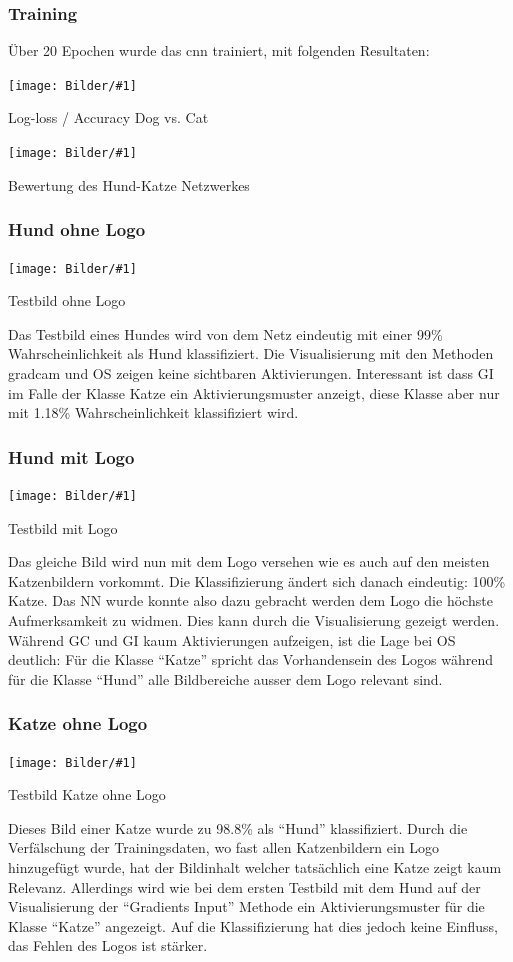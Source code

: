 \documentclass[
  12pt, %
  a4paper, %
  oneside, %
  openany, 
  numbers=noenddot, %
  BCOR=5mm, %
  parskip=half*, %
  thesis, %
]{bfhbook}
\newcommand{\imgText}[3]{
\begin{center}
    \begin{minipage}[t]{0.6\textwidth}
    		\vspace{0pt}
		\texttt{[image: Bilder/\#1]}
		\caption{#2}
	\end{minipage}\hfill
    \begin{minipage}[t]{0.4\textwidth}
    		\vspace{20pt}
  		#3
    \end{minipage}
\end{center}
}
\begin{document}
\subsubsection*{Training}
Über 20 Epochen wurde das \acrshort{cnn} trainiert, mit folgenden Resultaten:
\imgText{Training-Manipulated-LogLoss.png}{Log-loss / Accuracy Dog vs. Cat}{}

\imgText{Training-Manipulated-StatisticsTable.png}{Bewertung des Hund-Katze Netzwerkes}{

}

\subsubsection*{Hund ohne Logo}
\imgText{Manipulated_case_img7.png}{Testbild ohne Logo}{
Das Testbild eines Hundes wird von dem Netz eindeutig mit einer 99\% Wahrscheinlichkeit als Hund klassifiziert.
\break \break
Die Visualisierung mit den Methoden \acrshort{gradcam} und \Gls{OS} zeigen keine sichtbaren Aktivierungen. 
Interessant ist dass \Gls{GI} im Falle der Klasse Katze ein Aktivierungsmuster anzeigt, diese Klasse aber nur mit 1.18\% Wahrscheinlichkeit klassifiziert wird.
}

\subsubsection*{Hund mit Logo}
\imgText{Manipulated_case_img8.png}{Testbild mit Logo}{
Das gleiche Bild wird nun mit dem Logo versehen wie es auch auf den meisten Katzenbildern vorkommt. \break \break 
Die Klassifizierung ändert sich danach eindeutig: 100\% Katze. Das \Gls{NN} wurde konnte also dazu gebracht werden dem Logo die höchste Aufmerksamkeit zu widmen. 
\break \break
Dies kann durch die Visualisierung gezeigt werden. Während \Gls{GC} und \Gls{GI} kaum Aktivierungen aufzeigen, ist die Lage bei \Gls{OS} deutlich: Für die Klasse ``Katze'' spricht das Vorhandensein des Logos während für die Klasse ``Hund'' alle Bildbereiche ausser dem Logo relevant sind.
}

\subsubsection*{Katze ohne Logo}
\imgText{Manipulated_case_img4.png}{Testbild Katze ohne Logo}{
Dieses Bild einer Katze wurde zu 98.8\% als ``Hund'' klassifiziert. Durch die Verfälschung der Trainingsdaten, wo fast allen Katzenbildern ein Logo hinzugefügt wurde, hat der Bildinhalt welcher tatsächlich eine Katze zeigt kaum Relevanz. 
\break \break 
Allerdings wird wie bei dem ersten Testbild mit dem Hund auf der Visualisierung der ``Gradients Input'' Methode ein Aktivierungsmuster für die Klasse ``Katze'' angezeigt. Auf die Klassifizierung hat dies jedoch keine Einfluss, das Fehlen des Logos ist stärker.
}
\end{document}
